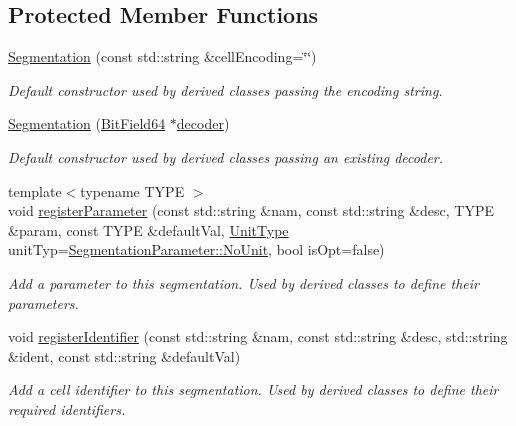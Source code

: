 \subsection*{Protected Member Functions}
\begin{DoxyCompactItemize}
\item 
\hyperlink{class_d_d4hep_1_1_d_d_segmentation_1_1_segmentation_a52364d20f9930e867d682ad453900e65}{Segmentation} (const std\+::string \&cell\+Encoding=\char`\"{}\char`\"{})
\begin{DoxyCompactList}\small\item\em Default constructor used by derived classes passing the encoding string. \end{DoxyCompactList}\item 
\hyperlink{class_d_d4hep_1_1_d_d_segmentation_1_1_segmentation_a2c565cf9552a24845ed91c686fc63f40}{Segmentation} (\hyperlink{class_d_d4hep_1_1_d_d_segmentation_1_1_bit_field64}{Bit\+Field64} $\ast$\hyperlink{class_d_d4hep_1_1_d_d_segmentation_1_1_segmentation_abec3489982d0fe91ef4b142d9d755576}{decoder})
\begin{DoxyCompactList}\small\item\em Default constructor used by derived classes passing an existing decoder. \end{DoxyCompactList}\item 
{\footnotesize template$<$typename T\+Y\+PE $>$ }\\void \hyperlink{class_d_d4hep_1_1_d_d_segmentation_1_1_segmentation_abb84893d0b56ded95213c52dc345ceba}{register\+Parameter} (const std\+::string \&nam, const std\+::string \&desc, T\+Y\+PE \&param, const T\+Y\+PE \&default\+Val, \hyperlink{class_d_d4hep_1_1_d_d_segmentation_1_1_segmentation_parameter_a36f5f8b8d812b2a2b81363377565d8d4}{Unit\+Type} unit\+Typ=\hyperlink{class_d_d4hep_1_1_d_d_segmentation_1_1_segmentation_parameter_a36f5f8b8d812b2a2b81363377565d8d4ab217a538e0ac077135786260a2221c14}{Segmentation\+Parameter\+::\+No\+Unit}, bool is\+Opt=false)
\begin{DoxyCompactList}\small\item\em Add a parameter to this segmentation. Used by derived classes to define their parameters. \end{DoxyCompactList}\item 
void \hyperlink{class_d_d4hep_1_1_d_d_segmentation_1_1_segmentation_ab513ba2af3efb21c7ca2e17c6829aeca}{register\+Identifier} (const std\+::string \&nam, const std\+::string \&desc, std\+::string \&ident, const std\+::string \&default\+Val)
\begin{DoxyCompactList}\small\item\em Add a cell identifier to this segmentation. Used by derived classes to define their required identifiers. \end{DoxyCompactList}\end{DoxyCompactItemize}
